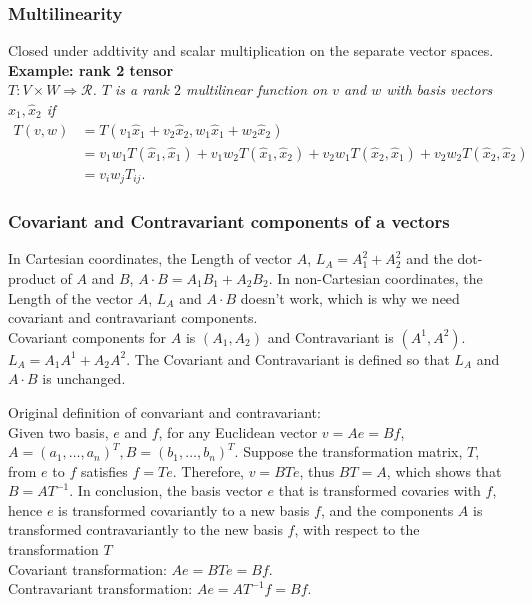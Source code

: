 \subsubsection{Multilinearity}
Closed under addtivity and scalar multiplication on the separate vector spaces. \\
{\bf Example: rank 2 tensor} \\ 
\emph{
$T: V \times W \Rightarrow \mathcal{R}$.
$T$ is a rank $2$ multilinear function on $v$ and $w$ with basis vectors $\hat{x}_1, \hat{x}_2$ if
\begin{equation*}
   \begin{aligned}
      T(v,w) & = T(v_1\hat{x}_1+v_2\hat{x}_2,w_1\hat{x}_1+w_2\hat{x}_2) \\
             & = v_1w_1T(\hat{x}_1,\hat{x}_1)+ v_1w_2T(\hat{x}_1,\hat{x}_2)+ v_2w_1T(\hat{x}_2,\hat{x}_1)+ v_2w_2T(\hat{x}_2,\hat{x}_2) \\
             & = v_iw_jT_{ij}. 
   \end{aligned}
\end{equation*}
}




\subsubsection{Covariant and Contravariant components of a vectors}
In Cartesian coordinates, the Length of vector $A$, $L_A= A_1^2+A_2^2$ and the dot-product of $A$ and $B$, $A \cdot B= A_1B_1 + A_2B_2$.
In non-Cartesian coordinates, the Length of the vector $A$, $L_A$ and $A\cdot B$ doesn't work, which is why we need covariant and contravariant components. \\
Covariant components for $A$ is $(A_1,A_2)$ and Contravariant is $(A^1,A^2)$.
$L_A= A_1A^1+A_2A^2$.
The Covariant and Contravariant is defined so that $L_A$ and $A\cdot B$ is unchanged.

Original definition of convariant and contravariant: \\
Given two basis, $e$ and $f$, for any Euclidean vector $v= A e= B f$, $A=(a_1,\dotsc,a_n)^T, B=(b_1,\dotsc,b_n)^T$. 
Suppose the transformation matrix, $T$, from $e$ to $f$ satisfies $f= Te$.
Therefore, $v= B T e$, thus $B T= A$, which shows that $B= A T^{-1}$. 
In conclusion, the basis vector $e$ that is transformed covaries with $f$, hence $e$ is transformed covariantly to a new basis $f$, and the components $A$ is transformed contravariantly to the new basis $f$, with respect to the transformation $T$  \\
Covariant transformation: $A e=  BTe= Bf$. \\
Contravariant transformation: $A e= AT^{-1} f= Bf$. \\
